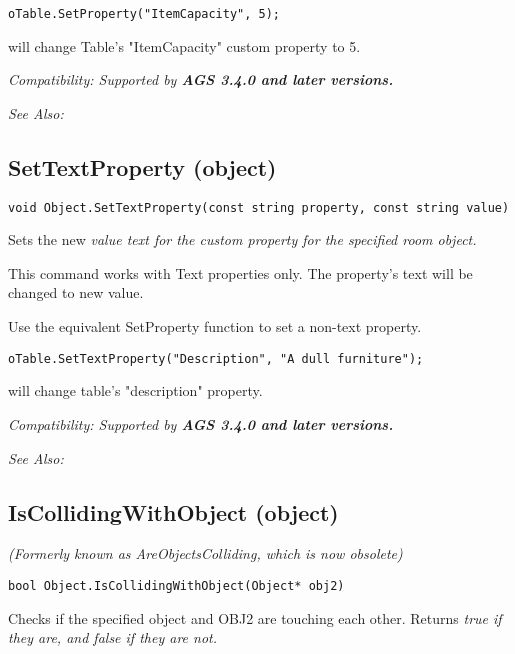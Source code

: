 \begin{verbatim}
oTable.SetProperty("ItemCapacity", 5);
\end{verbatim}
will change Table's "ItemCapacity" custom property to 5.

\it{Compatibility:} Supported by \bf{AGS 3.4.0} and later versions.

\it{See Also:} 


\subsection{SetTextProperty (object)}\label{Object.SetTextProperty}%

\begin{verbatim}
void Object.SetTextProperty(const string property, const string value)
\end{verbatim}
Sets the new \it{value} text for the custom \it{property} for the specified room object.

This command works with Text properties only. The property's text will be
changed to new value.

Use the equivalent SetProperty function to set a non-text property.

\begin{verbatim}
oTable.SetTextProperty("Description", "A dull furniture");
\end{verbatim}
will change table's "description" property.

\it{Compatibility:} Supported by \bf{AGS 3.4.0} and later versions.

\it{See Also:} 


\subsection{IsCollidingWithObject (object)}\label{Object.IsCollidingWithObject}%

\it{(Formerly known as AreObjectsColliding, which is now obsolete)}

\begin{verbatim}
bool Object.IsCollidingWithObject(Object* obj2)
\end{verbatim}
Checks if the specified object and OBJ2 are touching each other. Returns \it{true} if they
are, and \it{false} if they are not.

